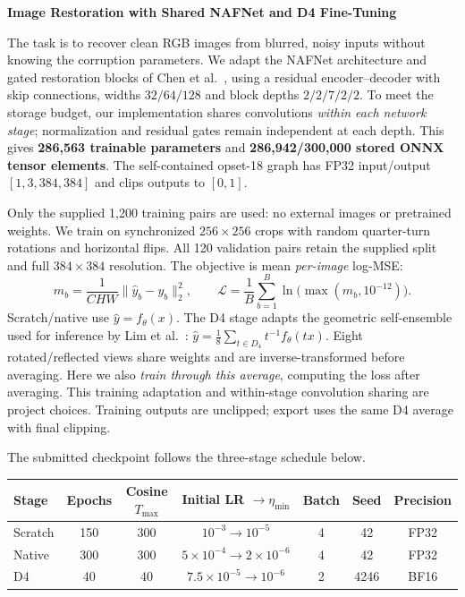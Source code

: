 \documentclass[10pt,a4paper]{article}
\makeatletter
\renewcommand\section{\@startsection{section}{1}{0pt}{7pt}{3pt}{\large\bfseries}}
\makeatother
\begin{document}
\begin{center}
  {\Large\bfseries Image Restoration with Shared NAFNet and D4 Fine-Tuning}
\end{center}
\vspace{-8pt}

\section{Method}
The task is to recover clean RGB images from blurred, noisy inputs without
knowing the corruption parameters. We adapt the NAFNet architecture and gated
restoration blocks of Chen et al.~\cite{chen2022nafnet}, using a residual
encoder--decoder with skip connections, widths $32/64/128$ and block depths
$2/2/7/2/2$. To meet the storage budget, our implementation shares convolutions
\emph{within each network stage}; normalization and residual gates remain
independent at each depth. This gives \textbf{286,563 trainable parameters} and
\textbf{286,942/300,000 stored ONNX tensor elements}. The self-contained
opset-18 graph has FP32 input/output $[1,3,384,384]$ and clips outputs to $[0,1]$.

Only the supplied 1,200 training pairs are used: no external images or
pretrained weights. We train on synchronized $256\!\times\!256$ crops with
random quarter-turn rotations and horizontal flips. All 120 validation pairs
retain the supplied split and full $384\!\times\!384$ resolution.
The objective is mean \emph{per-image} log-MSE:
\[
 m_b=\frac{1}{CHW}\lVert\hat y_b-y_b\rVert_2^2,
 \qquad \mathcal L=\frac1B\sum_{b=1}^{B}\ln\!\bigl(\max(m_b,10^{-12})\bigr).
\]
Scratch/native use $\hat y=f_\theta(x)$. The D4 stage adapts the geometric
self-ensemble used for inference by Lim et al.~\cite{lim2017edsr}:
$\hat y=\tfrac18\sum_{t\in D_4}t^{-1}f_\theta(tx)$. Eight rotated/reflected
views share weights and are inverse-transformed before averaging. Here we
also \emph{train through this average}, computing the loss after averaging.
This training adaptation and within-stage convolution sharing are project
choices. Training outputs are unclipped; export uses the same D4 average
with final clipping.

\section{Training}
The submitted checkpoint follows the three-stage schedule below.
\begin{center}
\small
\renewcommand{\arraystretch}{1.1}
\begin{tabular}{@{}lcccccc@{}}
\toprule
Stage & Epochs & Cosine $T_{\max}$ & Initial LR $\to\eta_{\min}$ & Batch & Seed & Precision \\
\midrule
Scratch & 150 & 300 & $10^{-3}\to10^{-5}$ & 4 & 42 & FP32 \\
Native & 300 & 300 & $5\!\times\!10^{-4}\to2\!\times\!10^{-6}$ & 4 & 42 & FP32 \\
D4 & 40 & 40 & $7.5\!\times\!10^{-5}\to10^{-6}$ & 2 & 4246 & BF16 \\
\bottomrule
\end{tabular}
\end{center}
\vspace{-6pt}
\end{document}
